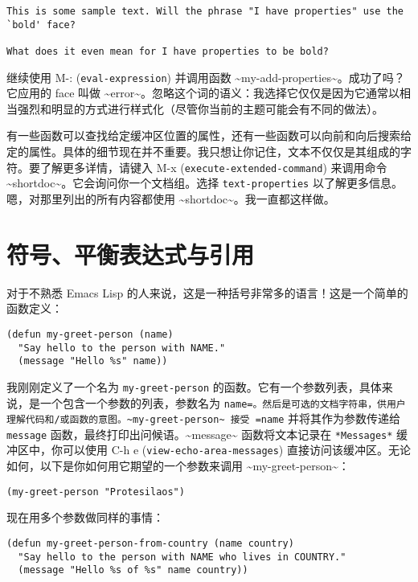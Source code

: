 \documentclass[11pt]{ctexart}
\begin{document}
\begin{verbatim}
This is some sample text. Will the phrase "I have properties" use the `bold' face?

What does it even mean for I have properties to be bold?
\end{verbatim}

继续使用 M-: (\texttt{eval-expression}) 并调用函数 \textasciitilde{}my-add-properties\textasciitilde{}。成功了吗？它应用的 face 叫做 \textasciitilde{}error\textasciitilde{}。忽略这个词的语义：我选择它仅仅是因为它通常以相当强烈和明显的方式进行样式化（尽管你当前的主题可能会有不同的做法）。

有一些函数可以查找给定缓冲区位置的属性，还有一些函数可以向前和向后搜索给定的属性。具体的细节现在并不重要。我只想让你记住，文本不仅仅是其组成的字符。要了解更多详情，请键入 M-x (\texttt{execute-extended-command}) 来调用命令 \textasciitilde{}shortdoc\textasciitilde{}。它会询问你一个文档组。选择 \texttt{text-properties} 以了解更多信息。嗯，对那里列出的所有内容都使用 \textasciitilde{}shortdoc\textasciitilde{}。我一直都这样做。
\section{符号、平衡表达式与引用}
\label{sec:orgb51d706}
对于不熟悉 Emacs Lisp 的人来说，这是一种括号非常多的语言！这是一个简单的函数定义：

\begin{verbatim}
(defun my-greet-person (name)
  "Say hello to the person with NAME."
  (message "Hello %s" name))
\end{verbatim}

我刚刚定义了一个名为 \texttt{my-greet-person} 的函数。它有一个参数列表，具体来说，是一个包含一个参数的列表，参数名为 \texttt{name=。然后是可选的文档字符串，供用户理解代码和/或函数的意图。\textasciitilde{}my-greet-person\textasciitilde{} 接受 =name} 并将其作为参数传递给 \texttt{message} 函数，最终打印出问候语。\textasciitilde{}message\textasciitilde{} 函数将文本记录在 \texttt{*Messages*} 缓冲区中，你可以使用 C-h e (\texttt{view-echo-area-messages}) 直接访问该缓冲区。无论如何，以下是你如何用它期望的一个参数来调用 \textasciitilde{}my-greet-person\textasciitilde{}：

\begin{verbatim}
(my-greet-person "Protesilaos")
\end{verbatim}

现在用多个参数做同样的事情：

\begin{verbatim}
(defun my-greet-person-from-country (name country)
  "Say hello to the person with NAME who lives in COUNTRY."
  (message "Hello %s of %s" name country))
\end{verbatim}
\end{document}
